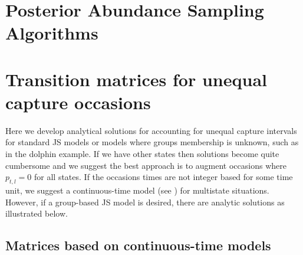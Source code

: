 \documentclass[12pt]{article}
\begin{document}
\section{Posterior Abundance Sampling Algorithms}


\section{Transition matrices for unequal capture occasions}

Here we develop analytical solutions for accounting for unequal capture intervals for standard JS models or models where groups membership is unknown, such as in the dolphin example. If we have other states then solutions become quite cumbersome and we suggest the best approach is to augment occasions where $p_{t,l}=0$ for all states. If the occasions times are not integer based for some time unit, we suggest a continuous-time model (see \citealt{xxx}) for multistate situations. However, if a group-based JS model is desired, there are analytic solutions as illustrated below.  

\subsection{Matrices based on continuous-time models}
\end{document}
